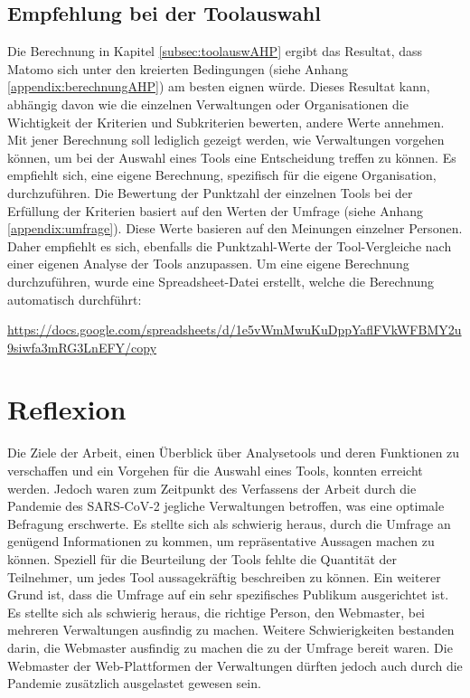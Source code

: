         \subsection{Empfehlung bei der Toolauswahl}
        Die Berechnung in Kapitel \ref{subsec:toolauswAHP} ergibt das Resultat, dass Matomo sich unter den kreierten Bedingungen (siehe Anhang \ref{appendix:berechnungAHP}) am besten eignen würde. Dieses Resultat kann, abhängig davon wie die einzelnen Verwaltungen oder Organisationen die Wichtigkeit der Kriterien und Subkriterien bewerten, andere Werte annehmen. Mit jener Berechnung soll lediglich gezeigt werden, wie Verwaltungen vorgehen können, um bei der Auswahl eines Tools eine Entscheidung treffen zu können. Es empfiehlt sich, eine eigene Berechnung, spezifisch für die eigene Organisation, durchzuführen. Die Bewertung der Punktzahl der einzelnen Tools bei der Erfüllung der Kriterien basiert auf den Werten der Umfrage (siehe Anhang \ref{appendix:umfrage}). Diese Werte basieren auf den Meinungen einzelner Personen. Daher empfiehlt es sich, ebenfalls die Punktzahl-Werte der Tool-Vergleiche nach einer eigenen Analyse der Tools anzupassen. Um eine eigene Berechnung durchzuführen, wurde eine Spreadsheet-Datei erstellt, welche die Berechnung automatisch durchführt:

        \url{https://docs.google.com/spreadsheets/d/1e5vWmMwuKuDppYaflFVkWFBMY2u9siwfa3mRG3LnEFY/copy}


        \newpage

\section{Reflexion}
Die Ziele der Arbeit, einen Überblick über Analysetools und deren Funktionen zu verschaffen und ein Vorgehen für die Auswahl eines Tools, konnten erreicht werden. Jedoch waren zum Zeitpunkt des Verfassens der Arbeit durch die Pandemie des SARS-CoV-2 jegliche Verwaltungen betroffen, was eine optimale Befragung erschwerte. Es stellte sich als schwierig heraus, durch die Umfrage an genügend Informationen zu kommen, um repräsentative Aussagen machen zu können. Speziell für die Beurteilung der Tools fehlte die Quantität der Teilnehmer, um jedes Tool aussagekräftig beschreiben zu können. Ein weiterer Grund ist, dass die Umfrage auf ein sehr spezifisches Publikum ausgerichtet ist. Es stellte sich als schwierig heraus, die richtige Person, den Webmaster, bei mehreren Verwaltungen ausfindig zu machen. Weitere Schwierigkeiten  bestanden darin, die  Webmaster ausfindig zu machen die zu der Umfrage bereit waren. Die Webmaster der Web-Plattformen der Verwaltungen dürften jedoch auch durch die Pandemie zusätzlich ausgelastet gewesen sein.

